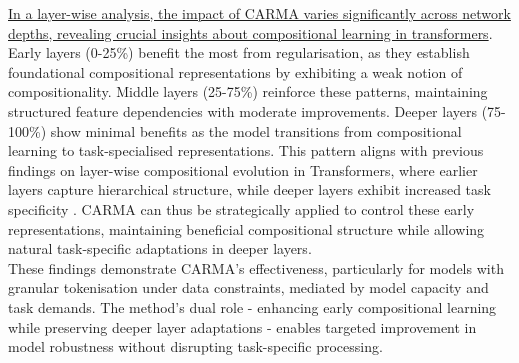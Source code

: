 \ul{In a layer-wise analysis, the impact of CARMA varies significantly across network depths, revealing crucial insights about compositional learning in transformers}. Early layers (0-25\%) benefit the most from regularisation, as they establish foundational compositional representations by exhibiting a weak notion of compositionality. Middle layers (25-75\%) reinforce these patterns, maintaining structured feature dependencies with moderate improvements. Deeper layers (75-100\%) show minimal benefits as the model transitions from compositional learning to task-specialised representations. This pattern aligns with previous findings on layer-wise compositional evolution in Transformers, where earlier layers capture hierarchical structure, while deeper layers exhibit increased task specificity \cite{feucht2024footprints}. CARMA can thus be strategically applied to control these early representations, maintaining beneficial compositional structure while allowing natural task-specific adaptations in deeper layers.\\
These findings demonstrate CARMA's effectiveness, particularly for models with granular tokenisation under data constraints, mediated by model capacity and task demands. The method's dual role - enhancing early compositional learning while preserving deeper layer adaptations - enables targeted improvement in model robustness without disrupting task-specific processing.

